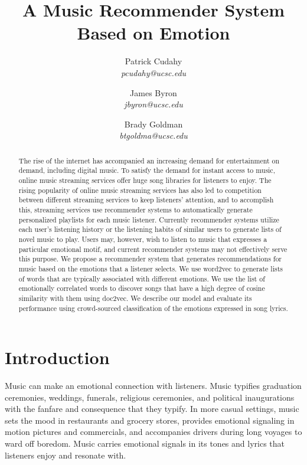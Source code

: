 \documentclass[10pt,twocolumn]{article}
\begin{document}
\title{A Music Recommender System Based on Emotion}

\author{
{\rm Patrick Cudahy} \\
\textit{pcudahy@ucsc.edu}
\and
{\rm James Byron} \\
\textit{jbyron@ucsc.edu}
\and
{\rm Brady Goldman} \\
\textit{btgoldma@ucsc.edu}
}

\maketitle

\begin{abstract}
The rise of the internet has accompanied an increasing demand for entertainment on demand, including digital music.  To satisfy the demand for instant access to music, online music streaming services offer huge song libraries for listeners to enjoy.  The rising popularity of online music streaming services has also led to competition between different streaming services to keep listeners' attention, and to accomplish this, streaming services use recommender systems to automatically generate personalized playlists for each music listener.  Currently recommender systems utilize each user's listening history or the listening habits of similar users to generate lists of novel music to play.  Users may, however, wish to listen to music that expresses a particular emotional motif, and current recommender systems may not effectively serve this purpose.  We propose a recommender system that generates recommendations for music based on the emotions that a listener selects.  We use word2vec to generate lists of words that are typically associated with different emotions.  We use the list of emotionally correlated words to discover songs that have a high degree of cosine similarity with them using doc2vec.  We describe our model and evaluate its performance using crowd-sourced classification of the emotions expressed in song lyrics.
\end{abstract}

\section{Introduction}
Music can make an emotional connection with listeners.  Music typifies graduation ceremonies, weddings, funerals, religious ceremonies, and political inaugurations with the fanfare and consequence that they typify.  In more casual settings, music sets the mood in restaurants and grocery stores, provides emotional signaling in motion pictures and commercials, and accompanies drivers during long voyages to ward off boredom.  Music carries emotional signals in its tones and lyrics that listeners enjoy and resonate with.
\end{document}

